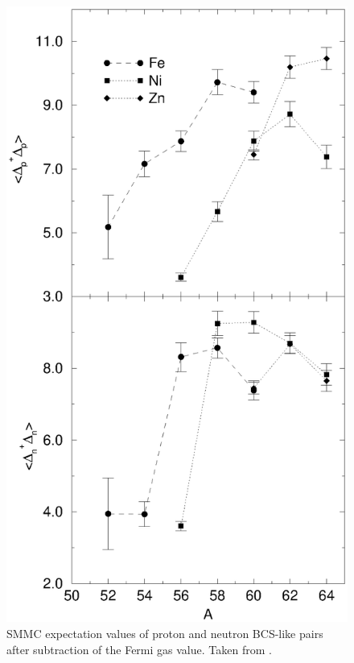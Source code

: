 \documentclass[rmp,aps,floatfix]{revtex4}
\begin{document}
\begin{figure}
\includegraphics[scale=0.5,angle=0]{dean_hjorthjensen_fig15.ps}
\caption{SMMC expectation values of proton and neutron BCS-like pairs after
subtraction of the Fermi gas value. Taken from  \protect\cite{Langanke95}.}
\label{bcs_pairs}
\end{figure}
\end{document}
